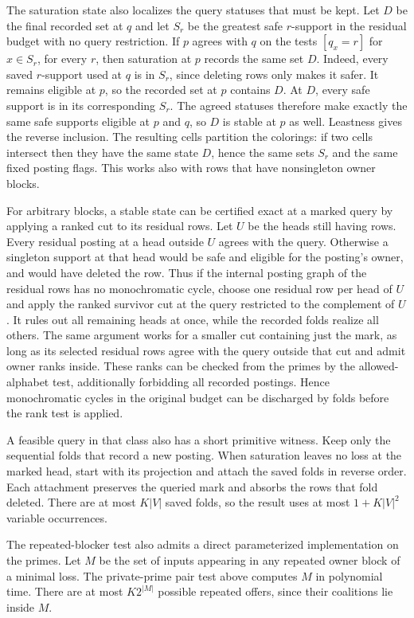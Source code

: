 The saturation state also localizes the query statuses
that must be kept. Let $D$ be the final recorded set at
$q$ and let $S_r$ be the greatest safe $r$-support in
the residual budget with no query restriction. If $p$
agrees with $q$ on the tests $[q_x=r]$ for $x\in S_r$,
for every $r$, then saturation at $p$ records the same
set $D$. Indeed, every saved $r$-support used at $q$
is in $S_r$, since deleting rows only makes it safer.
It remains eligible at $p$, so the recorded set at $p$
contains $D$. At $D$, every safe support is in its
corresponding $S_r$. The agreed statuses therefore
make exactly the same safe supports eligible at $p$
and $q$, so $D$ is stable at $p$ as well. Leastness
gives the reverse inclusion. The resulting cells
partition the colorings: if two cells intersect then
they have the same state $D$, hence the same sets
$S_r$ and the same fixed posting flags. This works
also with rows that have nonsingleton owner blocks.

For arbitrary blocks, a stable state can be certified
exact at a marked query by applying a ranked cut to
its residual rows. Let $U$ be the heads still having
rows. Every residual posting at a head outside $U$
agrees with the query. Otherwise a singleton support
at that head would be safe and eligible for the
posting's owner, and would have deleted the row.
Thus if the internal posting graph of the residual
rows has no monochromatic cycle, choose one residual
row per head of $U$ and apply the ranked survivor cut
at the query restricted to the complement of $U$.
It rules out all remaining heads at once, while the
recorded folds realize all others. The same argument
works for a smaller cut containing just the mark,
as long as its selected residual rows agree with the
query outside that cut and admit owner ranks inside.
These ranks can be checked from the primes by the
allowed-alphabet test, additionally forbidding all
recorded postings. Hence monochromatic cycles in
the original budget can be discharged by folds
before the rank test is applied.

A feasible query in that class also has a short
primitive witness. Keep only the sequential folds
that record a new posting. When saturation leaves
no loss at the marked head, start with its
projection and attach the saved folds in reverse
order. Each attachment preserves the queried
mark and absorbs the rows that fold deleted.
There are at most $K|V|$ saved folds, so the
result uses at most $1+K|V|^2$ variable
occurrences.

The repeated-blocker test also admits a direct
parameterized implementation on the primes. Let
$M$ be the set of inputs appearing in any repeated
owner block of a minimal loss. The private-prime
pair test above computes $M$ in polynomial time.
There are at most $K2^{|M|}$ possible repeated
offers, since their coalitions lie inside $M$.


